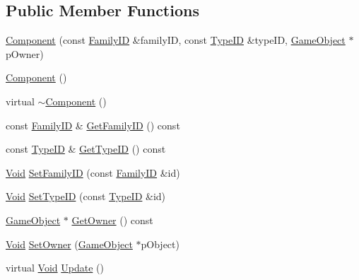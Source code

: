 \subsection*{Public Member Functions}
\begin{DoxyCompactItemize}
\item 
\hyperlink{classgl_1_1_component_a412f50df1466615614c3b62421cebbc7}{Component} (const \hyperlink{classgl_1_1_component_a55fcc946bfc525917e6380e5b71a3f49}{Family\-I\-D} \&family\-I\-D, const \hyperlink{classgl_1_1_component_a2dae94eddffdba218f51d19dd9d66e4e}{Type\-I\-D} \&type\-I\-D, \hyperlink{classgl_1_1_game_object}{Game\-Object} $\ast$p\-Owner)
\item 
\hyperlink{classgl_1_1_component_a6c651251c2ce4c2243eda34815e80d59}{Component} ()
\item 
virtual \hyperlink{classgl_1_1_component_a43f758bf7272ace3aaae840489a4a8ae}{$\sim$\-Component} ()
\item 
const \hyperlink{classgl_1_1_component_a55fcc946bfc525917e6380e5b71a3f49}{Family\-I\-D} \& \hyperlink{classgl_1_1_component_aae7441b8490f9edafb99189b937fd8a0}{Get\-Family\-I\-D} () const 
\item 
const \hyperlink{classgl_1_1_component_a2dae94eddffdba218f51d19dd9d66e4e}{Type\-I\-D} \& \hyperlink{classgl_1_1_component_a5a4746393db3e96ca12b662b7ff7ae3a}{Get\-Type\-I\-D} () const 
\item 
\hyperlink{_basic_types_8hpp_afdf0f22c576e6ee1b982f64b839c4bea}{Void} \hyperlink{classgl_1_1_component_a5583d825aaba0cfbebe199cd36948cb8}{Set\-Family\-I\-D} (const \hyperlink{classgl_1_1_component_a55fcc946bfc525917e6380e5b71a3f49}{Family\-I\-D} \&id)
\item 
\hyperlink{_basic_types_8hpp_afdf0f22c576e6ee1b982f64b839c4bea}{Void} \hyperlink{classgl_1_1_component_aba697a90e30a22386b19dc02bcb6ca58}{Set\-Type\-I\-D} (const \hyperlink{classgl_1_1_component_a2dae94eddffdba218f51d19dd9d66e4e}{Type\-I\-D} \&id)
\item 
\hyperlink{classgl_1_1_game_object}{Game\-Object} $\ast$ \hyperlink{classgl_1_1_component_a8bc9370f252fd5e9e6f7d47b5f84429b}{Get\-Owner} () const 
\item 
\hyperlink{_basic_types_8hpp_afdf0f22c576e6ee1b982f64b839c4bea}{Void} \hyperlink{classgl_1_1_component_acc20da81fa79ebeaf5bfd1d596cb2641}{Set\-Owner} (\hyperlink{classgl_1_1_game_object}{Game\-Object} $\ast$p\-Object)
\item 
virtual \hyperlink{_basic_types_8hpp_afdf0f22c576e6ee1b982f64b839c4bea}{Void} \hyperlink{classgl_1_1_component_afb18555fefa75987ff5532e874e3b3a1}{Update} ()
\end{DoxyCompactItemize}


